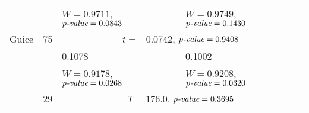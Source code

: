 \begin{table}[]
\begin{adjustbox}{center}
\begin{tabular}{llll}
 &  & $W = 0.9711$, $p\emph{-value} = 0.0843$ & $W = 0.9749$, $p\emph{-value} = 0.1430$ \\
\multirow{-3}{*}{Guice} & \multirow{-3}{*}{75} & \multicolumn{2}{c}{$t = -0.0742$, $p\emph{-value} = 0.9408$} \\
\rowcolor{Gray}
\cellcolor{Gray} & \cellcolor{Gray} & 0.1078 & 0.1002 \\
\rowcolor{Gray}
\cellcolor{Gray} & \cellcolor{Gray} & $W = 0.9178$, $p\emph{-value} = 0.0268$ & $W = 0.9208$, $p\emph{-value} = 0.0320$ \\
\rowcolor{Gray}
\multirow{-3}{*}{\cellcolor{Gray}Jsoup} & \multirow{-3}{*}{\cellcolor{Gray}29} & \multicolumn{2}{c}{\cellcolor{Gray}$T = 176.0$, $p\emph{-value} = 0.3695$}\\
\bottomrule
\end{tabular}
\end{adjustbox}
\end{table}

